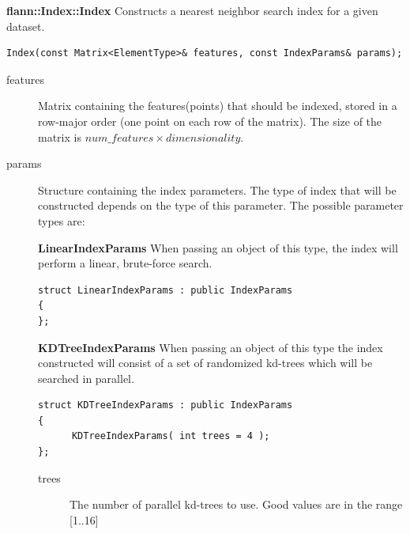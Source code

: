 \documentclass[letter,10pt]{article}
\begin{document}
\textbf{flann::Index::Index}
Constructs a nearest neighbor search index for a given dataset.
\begin{Verbatim}[fontsize=\footnotesize,frame=single]
Index(const Matrix<ElementType>& features, const IndexParams& params);
\end{Verbatim}
\begin{description}
\item[features] Matrix containing the features(points) that should be indexed, stored in a row-major order (one point 
on each row of the matrix). The size of the matrix is $num\_features \times dimensionality$.

\item[params] Structure containing the index parameters. The type of index that will be constructed depends on the type 
of this parameter. The possible parameter types are:

\textbf{LinearIndexParams} When passing an object of this type, the index will perform a linear, brute-force search.
\begin{Verbatim}[fontsize=\footnotesize]
struct LinearIndexParams : public IndexParams 
{
};
\end{Verbatim}

\textbf{KDTreeIndexParams} When passing an object of this type the index constructed will consist of a set 
of randomized kd-trees which will be searched in parallel.
\begin{Verbatim}[fontsize=\footnotesize]
struct KDTreeIndexParams : public IndexParams
{
      KDTreeIndexParams( int trees = 4 );
};
\end{Verbatim}
\begin{description}
 \item[trees] The number of parallel kd-trees to use. Good values are in the range [1..16]
\end{description}


\end{description}
\end{document}

